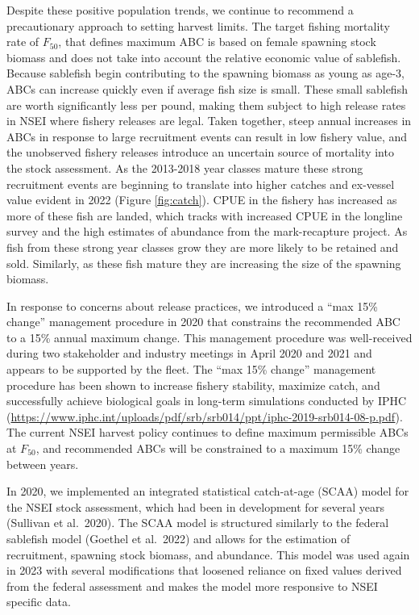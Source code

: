 \documentclass[
]{article}
\begin{document}
Despite these positive population trends, we continue to recommend a precautionary approach to setting harvest limits. The target fishing mortality rate of \(F_{50}\), that defines maximum ABC is based on female spawning stock biomass and does not take into account the relative economic value of sablefish. Because sablefish begin contributing to the spawning biomass as young as age-3, ABCs can increase quickly even if average fish size is small. These small sablefish are worth significantly less per pound, making them subject to high release rates in NSEI where fishery releases are legal. Taken together, steep annual increases in ABCs in response to large recruitment events can result in low fishery value, and the unobserved fishery releases introduce an uncertain source of mortality into the stock assessment. As the 2013-2018 year classes mature these strong recruitment events are beginning to translate into higher catches and ex-vessel value evident in 2022 (Figure \ref{fig:catch}). CPUE in the fishery has increased as more of these fish are landed, which tracks with increased CPUE in the longline survey and the high estimates of abundance from the mark-recapture project. As fish from these strong year classes grow they are more likely to be retained and sold. Similarly, as these fish mature they are increasing the size of the spawning biomass.

In response to concerns about release practices, we introduced a ``max 15\% change'' management procedure in 2020 that constrains the recommended ABC to a 15\% annual maximum change. This management procedure was well-received during two stakeholder and industry meetings in April 2020 and 2021 and appears to be supported by the fleet. The ``max 15\% change'' management procedure has been shown to increase fishery stability, maximize catch, and successfully achieve biological goals in long-term simulations conducted by IPHC (\url{https://www.iphc.int/uploads/pdf/srb/srb014/ppt/iphc-2019-srb014-08-p.pdf}). The current NSEI harvest policy continues to define maximum permissible ABCs at \(F_{50}\), and recommended ABCs will be constrained to a maximum 15\% change between years.

In 2020, we implemented an integrated statistical catch-at-age (SCAA) model for the NSEI stock assessment, which had been in development for several years (Sullivan et al.~2020). The SCAA model is structured similarly to the federal sablefish model (Goethel et al.~2022) and allows for the estimation of recruitment, spawning stock biomass, and abundance. This model was used again in 2023 with several modifications that loosened reliance on fixed values derived from the federal assessment and makes the model more responsive to NSEI specific data.
\end{document}
